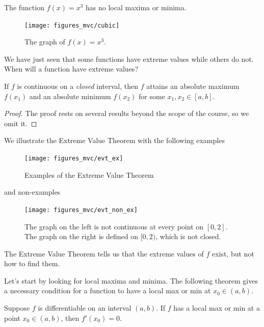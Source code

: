 \documentclass[12pt,letterpaper,reqno]{article}
\numberwithin{equation}{section}
\begin{document}
{\begin{example}
The function $f(x)=x^3$ has no local maxima or minima.
\begin{figure}[h]
	\begin{center}
	\texttt{[image: figures\_mvc/cubic]}
\end{center}
\caption{The graph of $f(x)=x^3$.}
\end{figure}	
\end{example}

We have just seen that some functions have extreme values while others do not. When will a function have extreme values?

\begin{thm}
	If $f$ is continuous on a \emph{closed} interval, then $f$ attains an absolute maximum $f(x_1)$ and an absolute minimum $f(x_2)$ for some $x_1,x_2 \in [a,b]$.	
\end{thm}

\begin{proof}
	The proof rests on several results beyond the scope of the course, so we omit it.
\end{proof}

We illustrate the Extreme Value Theorem with the following examples
\begin{figure}[h]
	\begin{center}
	\texttt{[image: figures\_mvc/evt\_ex]}
	\end{center}	
	\caption{Examples of the Extreme Value Theorem}
\end{figure}

and non-examples

\begin{figure}[h]
	\begin{center}
	\texttt{[image: figures\_mvc/evt\_non\_ex]}
	\end{center}	
	\caption{The graph on the left is not continuous at every point on $[0,2]$. The graph on the right is defined on $[0,2)$, which is not closed.}
\end{figure}
The Extreme Value Theorem tells us that the extreme values of $f$ exist, but not how to find them. 

Let's start by looking for local maxima and minima. The following theorem gives a necessary condition for a function to have a local max or min at $x_0 \in (a,b)$.

\begin{thm}\label{thm:fermats_theorem}
Suppose $f$ is differentiable on an interval $(a,b)$. If $f$ has a local max or min at a point $x_0 \in (a,b)$, then $f'(x_0)=0$.
\end{thm}

}
\end{document}

